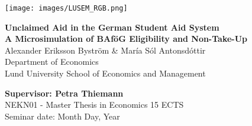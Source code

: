 
\sloppy  %

\texttt{[image: images/LUSEM\_RGB.png]} %

\vspace{2cm}
\begin{center}       
    \vspace*{2cm}
    {\LARGE \textbf{Unclaimed Aid in the German Student Aid System} \\ 
    \textbf{A Microsimulation of BAföG Eligibility and Non-Take-Up}} \\
    \vspace{1cm}
    \Large Alexander Eriksson Byström \& María Sól Antonsdóttir \\[0.3cm]
    \normalsize Department of Economics \\ 
    Lund University School of Economics and Management
\end{center}
\vspace{2cm}

\vfill
\noindent 
\textbf{Supervisor: Petra Thiemann} \\ 
NEKN01 - Master Thesis in Economics 15 ECTS \\ 
Seminar date: Month Day, Year
\thispagestyle{empty}

\fussy  %

\newpage
\tableofcontents
\thispagestyle{empty}
